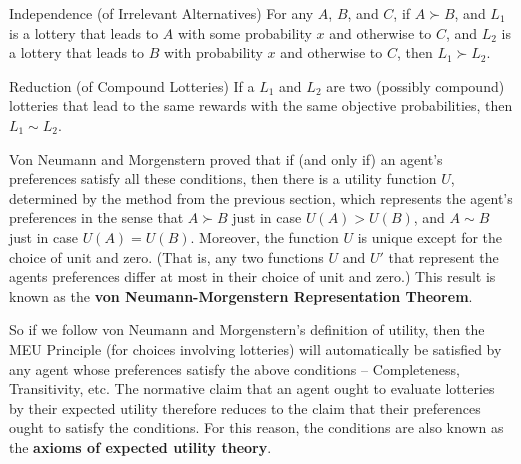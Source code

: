 \vspace{-2mm}
\begin{genericthm}{Independence (of Irrelevant Alternatives)}
  For any $A$, $B$, and $C$, if $A \succ B$, and $L_1$ is a lottery
  that leads to $A$ with some probability $x$ and otherwise to $C$,
  and $L_2$ is a lottery that leads to $B$ with probability $x$ and
  otherwise to $C$, then $L_1 \succ L_2$.
\end{genericthm}
\vspace{-2mm}
\begin{genericthm}{Reduction (of Compound Lotteries)}
  If a $L_1$ and $L_2$ are two (possibly compound) lotteries that lead
  to the same rewards with the same objective probabilities, then $L_1
  \sim L_2$.
\end{genericthm}

Von Neumann and Morgenstern proved that if (and only if) an agent's
preferences satisfy all these conditions, then there is a utility
function $U$, determined by the method from the previous section,
which represents the agent's preferences in the sense that $A \succ B$
just in case $U(A) > U(B)$, and $A \sim B$ just in case $U(A) =
U(B)$. Moreover, the function $U$ is unique except for the choice of
unit and zero. (That is, any two functions $U$ and $U'$ that represent
the agents preferences differ at most in their choice of unit and
zero.) This result is known as the \textbf{von Neumann-Morgenstern
  Representation Theorem}.


So if we follow von Neumann and Morgenstern's definition of utility,
then the MEU Principle (for choices involving lotteries) will
automatically be satisfied by any agent whose preferences satisfy the
above conditions -- Completeness, Transitivity, etc. The normative
claim that an agent ought to evaluate lotteries by their expected
utility therefore reduces to the claim that their preferences ought to
satisfy the conditions. For this reason, the conditions are also known
as the \textbf{axioms of expected utility theory}.

